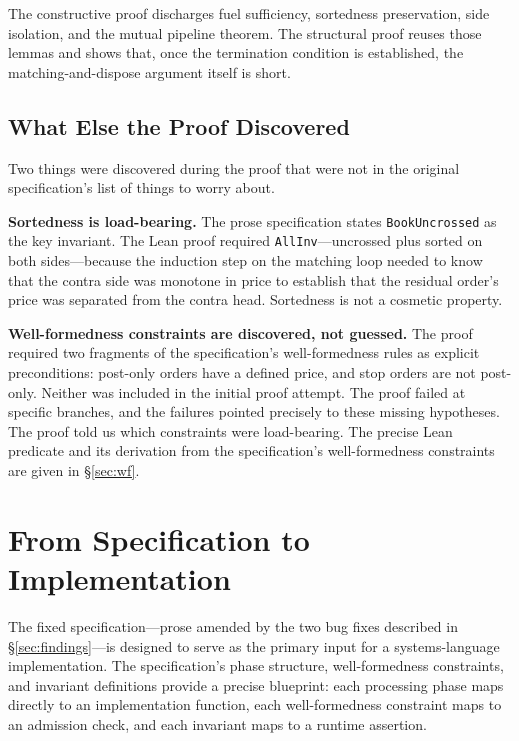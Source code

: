 \documentclass[11pt,a4paper]{article}
\begin{document}
The constructive proof discharges fuel sufficiency, sortedness
preservation, side isolation, and the mutual pipeline theorem. The
structural proof reuses those lemmas and shows that, once the
termination condition is established, the matching-and-dispose argument
itself is short.

\subsection{What Else the Proof Discovered}
\label{sec:lean-discovered}

Two things were discovered during the proof that were not in the original
specification's list of things to worry about.

\textbf{Sortedness is load-bearing.} The prose specification states
\texttt{BookUncrossed} as the key invariant. The Lean proof required
\texttt{AllInv}---uncrossed plus sorted on both sides---because the
induction step on the matching loop needed to know that the contra side
was monotone in price to establish that the residual order's price was
separated from the contra head. Sortedness is not a cosmetic property.

\textbf{Well-formedness constraints are discovered, not guessed.} The
proof required two fragments of the specification's well-formedness
rules as explicit preconditions: post-only orders have a defined price,
and stop orders are not post-only. Neither was included in the initial
proof attempt. The proof failed at specific branches, and the failures
pointed precisely to these missing hypotheses. The proof told us which
constraints were load-bearing. The precise Lean predicate and its
derivation from the specification's well-formedness constraints are
given in \S\ref{sec:wf}.


\section{From Specification to Implementation}
\label{sec:synthesis}

The fixed specification---prose amended by the two bug fixes described
in \S\ref{sec:findings}---is designed to serve as the primary input for
a systems-language implementation. The specification's phase structure,
well-formedness constraints, and invariant definitions provide a precise
blueprint: each processing phase maps directly to an implementation
function, each well-formedness constraint maps to an admission check,
and each invariant maps to a runtime assertion.
\end{document}
